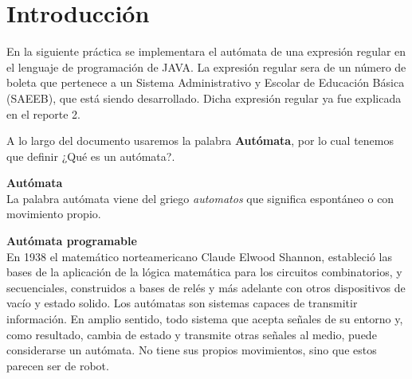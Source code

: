 \documentclass[12pt]{article}
\begin{document}

	\section{Introducción}
	En la siguiente práctica se implementara el autómata de una expresión regular en el lenguaje de programación de JAVA.
	La expresión regular sera de un número de boleta que pertenece a un Sistema Administrativo y Escolar 
	de Educación Básica (SAEEB), que está siendo desarrollado. Dicha expresión regular ya fue explicada en el reporte 2.

	A lo largo del documento usaremos la palabra \textbf{Autómata}, por lo cual tenemos que definir
	¿Qué es un autómata?.

	\noindent\textbf{Autómata} \\
	La palabra autómata viene del griego \textsl{automatos} que significa espontáneo o con movimiento propio. 

	\noindent\textbf{Autómata programable}\\
	En 1938 el matemático norteamericano Claude Elwood Shannon, estableció las bases de la 
	aplicación de la lógica matemática para los circuitos combinatorios, y secuenciales, construidos
	a bases de relés y más adelante con otros dispositivos de vacío y estado solido.
	Los autómatas son sistemas capaces de transmitir información. En amplio sentido, todo sistema que
	acepta señales de su entorno y, como resultado, cambia de estado y transmite otras señales al medio,
	puede considerarse un autómata.
	No tiene sus propios movimientos, sino que estos parecen ser de robot.
\end{document}
